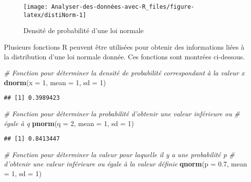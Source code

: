 \documentclass[
  french,
]{book}
\newenvironment{Shaded}{\begin{snugshade}}{\end{snugshade}}
\newcommand{\CommentTok}[1]{\textcolor[rgb]{0.56,0.35,0.01}{\textit{#1}}}
\newcommand{\DataTypeTok}[1]{\textcolor[rgb]{0.13,0.29,0.53}{#1}}
\newcommand{\DecValTok}[1]{\textcolor[rgb]{0.00,0.00,0.81}{#1}}
\newcommand{\FloatTok}[1]{\textcolor[rgb]{0.00,0.00,0.81}{#1}}
\newcommand{\KeywordTok}[1]{\textcolor[rgb]{0.13,0.29,0.53}{\textbf{#1}}}
\newcommand{\NormalTok}[1]{#1}
\begin{document}
\begin{figure}

{\centering \texttt{[image: Analyser-des-données-avec-R\_files/figure-latex/distiNorm-1]} 

}

\caption{Densité de probabilité d'une loi normale}\label{fig:distiNorm}
\end{figure}

Plusieurs fonctions R peuvent être utilisées pour obtenir des informations liées à la distribution d'une loi normale donnée. Ces fonctions sont montrées ci-dessous.

\begin{Shaded}
\begin{Highlighting}[]
\CommentTok{# Fonction pour déterminer la densité de probabilité correspondant à la valeur x}
\KeywordTok{dnorm}\NormalTok{(}\DataTypeTok{x =} \DecValTok{1}\NormalTok{, }\DataTypeTok{mean =} \DecValTok{1}\NormalTok{, }\DataTypeTok{sd =} \DecValTok{1}\NormalTok{)}
\end{Highlighting}
\end{Shaded}

\begin{verbatim}
## [1] 0.3989423
\end{verbatim}

\begin{Shaded}
\begin{Highlighting}[]
\CommentTok{# Fonction pour déterminer la probabilité d'obtenir une valeur inférieure ou }
\CommentTok{# égale à q}
\KeywordTok{pnorm}\NormalTok{(}\DataTypeTok{q =} \DecValTok{2}\NormalTok{, }\DataTypeTok{mean =} \DecValTok{1}\NormalTok{, }\DataTypeTok{sd =} \DecValTok{1}\NormalTok{)}
\end{Highlighting}
\end{Shaded}

\begin{verbatim}
## [1] 0.8413447
\end{verbatim}

\begin{Shaded}
\begin{Highlighting}[]
\CommentTok{# Fonction pour déterminer la valeur pour laquelle il y a une probabilité p }
\CommentTok{# d'obtenir une valeur inférieure ou égale à la valeur définie}
\KeywordTok{qnorm}\NormalTok{(}\DataTypeTok{p =} \FloatTok{0.7}\NormalTok{, }\DataTypeTok{mean =} \DecValTok{1}\NormalTok{, }\DataTypeTok{sd =} \DecValTok{1}\NormalTok{)}
\end{Highlighting}
\end{Shaded}
\end{document}
